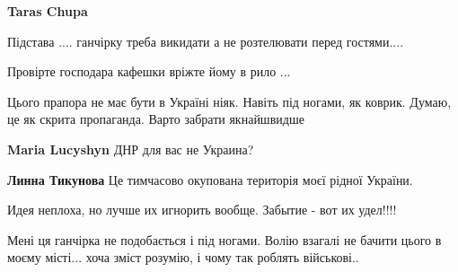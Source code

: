 \begin{itemize}
\begin{itemize}
\textbf{Taras Chupa} 

Підстава .... ганчірку треба викидати а не розтелювати перед гостями....

Провірте господара кафешки вріжте йому в рило ...

\end{itemize}

 

Цього прапора не має бути в Україні ніяк. Навіть під ногами, як коврик. Думаю,
це як скрита пропаганда. Варто забрати якнайшвидше

\begin{itemize}
 
\textbf{Maria Lucyshyn} ДНР для вас не Украина?

\begin{itemize}
 
\textbf{Линна Тикунова} Це тимчасово окупована територія моєї рідної України.
\end{itemize}
\end{itemize}


 
Идея неплоха, но лучше их игнорить вообще. Забытие - вот их удел!!!!

 

Мені ця ганчірка не подобається і під ногами. Волію взагалі не бачити цього в
моєму місті... хоча зміст розумію, і чому так роблять військові..



\end{itemize}
